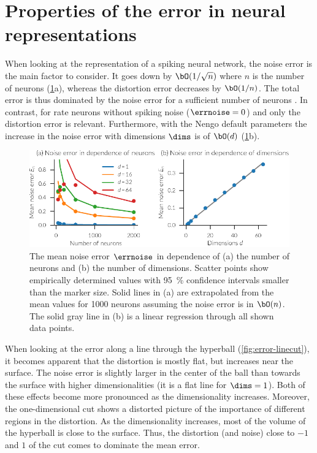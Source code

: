 \section{Properties of the error in neural representations}\label{sec:neural-err}
When looking at the representation of a spiking neural network, the noise error is the main factor to consider.
It goes down by $\bO(1/\sqrt{n})$ where $n$ is the number of neurons (\cref{fig:noise-error}a), whereas the distortion error decreases by $\bO(1/n)$.
The total error is thus dominated by the noise error for a sufficient number of neurons \parencite[Fig.~2.6]{eliasmith2003}.
In contrast, for rate neurons without spiking noise ($\errnoise = 0$) and only the distortion error is relevant.
Furthermore, with the Nengo default parameters the increase in the noise error with dimensions $\dims$ is of $\bO(d)$ (\cref{fig:noise-error}b).
\begin{figure}
    \centering
    \includegraphics{figures/noise-error}
    \caption[Mean noise error with $\csdist(\dims + 2)$ distributed intercepts]{The mean noise error $\errnoise$ in dependence of (a) the number of neurons and (b) the number of dimensions. Scatter points show empirically determined values with \SI{95}{\percent} confidence intervals smaller than the marker size. Solid lines in (a) are extrapolated from the mean values for \num{1000} neurons assuming the noise error is in $\bO(n)$. The solid gray line in (b) is a linear regression through all shown data points.}\label{fig:noise-error}
\end{figure}

When looking at the error along a line through the hyperball (\cref{fig:error-linecut}), it becomes apparent that the distortion is mostly flat, but increases near the surface.
The noise error is slightly larger in the center of the ball than towards the surface with higher dimensionalities (it is a flat line for $\dims = 1$).
Both of these effects become more pronounced as the dimensionality increases.
Moreover, the one-dimensional cut shows a distorted picture of the importance of different regions in the distortion.
As the dimensionality increases, most of the volume of the hyperball is close to the surface.
Thus, the distortion (and noise) close to $-1$ and $1$ of the cut comes to dominate the mean error.

